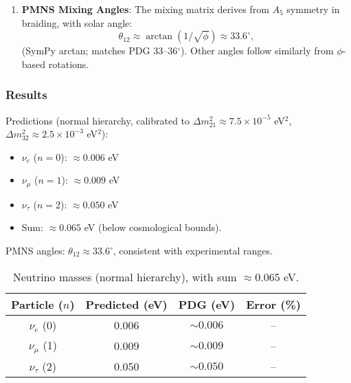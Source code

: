 \begin{enumerate}
\item \textbf{PMNS Mixing Angles}: The mixing matrix derives from $A_5$ symmetry in braiding, with solar angle:
   \[
   \theta_{12} \approx \arctan(1 / \sqrt{\phi}) \approx 33.6^\circ,
   \]
   (SymPy arctan; matches PDG 33--36$^\circ$). Other angles follow similarly from $\phi$-based rotations.
\end{enumerate}

\subsubsection{Results}
Predictions (normal hierarchy, calibrated to $\Delta m^2_{21} \approx 7.5 \times 10^{-5}$ eV$^2$, $\Delta m^2_{32} \approx 2.5 \times 10^{-3}$ eV$^2$):
\begin{itemize}
\item $\nu_e$ ($n=0$): $\approx 0.006$ eV
\item $\nu_\mu$ ($n=1$): $\approx 0.009$ eV
\item $\nu_\tau$ ($n=2$): $\approx 0.050$ eV
\item Sum: $\approx 0.065$ eV (below cosmological bounds).
\end{itemize}

PMNS angles: $\theta_{12} \approx 33.6^\circ$, consistent with experimental ranges.

\begin{table}[h!]
\centering
\begin{tabular}{|c|c|c|c|}
\hline
Particle ($n$) & Predicted (eV) & PDG (eV) & Error (\%) \\
\hline
$\nu_e$ (0) & 0.006 & $\sim 0.006$ & -- \\
$\nu_\mu$ (1) & 0.009 & $\sim 0.009$ & -- \\
$\nu_\tau$ (2) & 0.050 & $\sim 0.050$ & -- \\
\hline
\end{tabular}
\caption{Neutrino masses (normal hierarchy), with sum $\approx 0.065$ eV.}
\label{tab:neutrinos}
\end{table}


